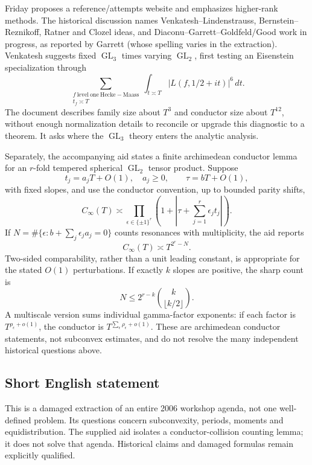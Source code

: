 \documentclass[11pt]{article}
\begin{document}
Friday proposes a reference/attempts website and emphasizes higher-rank methods. The historical discussion names Venkatesh--Lindenstrauss, Bernstein--Reznikoff, Ratner and Clozel ideas, and Diaconu--Garrett--Goldfeld/Good work in progress, as reported by Garrett (whose spelling varies in the extraction). Venkatesh suggests fixed $\operatorname{GL}_3$ times varying $\operatorname{GL}_2$, first testing an Eisenstein specialization through
\[
 \sum_{\substack{f\ \mathrm{level\ one\ Hecke\!\! -\!\! Maass}\\t_f\asymp T}}
 \int_{t\asymp T}|L(f,1/2+it)|^6\,dt.
\]
The document describes family size about $T^3$ and conductor size about $T^{12}$, without enough normalization details to reconcile or upgrade this diagnostic to a theorem. It asks where the $\operatorname{GL}_3$ theory enters the analytic analysis.

Separately, the accompanying aid states a finite archimedean conductor lemma for an $r$-fold tempered spherical $\operatorname{GL}_2$ tensor product. Suppose
\[
 t_j=a_jT+O(1),\quad a_j\geq0,\qquad \tau=bT+O(1),
\]
with fixed slopes, and use the conductor convention, up to bounded parity shifts,
\[
 C_\infty(T)\asymp\prod_{\epsilon\in\{\pm1\}^r}
       \left(1+\left|\tau+\sum_{j=1}^r\epsilon_jt_j\right|\right).
\]
If $N=\#\{\epsilon:b+\sum_j\epsilon_ja_j=0\}$ counts resonances with multiplicity, the aid reports
\[
 C_\infty(T)\asymp T^{2^r-N}.
\]
Two-sided comparability, rather than a unit leading constant, is appropriate for the stated $O(1)$ perturbations. If exactly $k$ slopes are positive, the sharp count is
\[
 N\leq2^{r-k}\binom{k}{\lfloor k/2\rfloor}.
\]
A multiscale version sums individual gamma-factor exponents: if each factor is $T^{\rho_\epsilon+o(1)}$, the conductor is $T^{\sum_\epsilon\rho_\epsilon+o(1)}$. These are archimedean conductor statements, not subconvex estimates, and do not resolve the many independent historical questions above.
\subsection{Short English statement}
This is a damaged extraction of an entire 2006 workshop agenda, not one well-defined problem. Its questions concern subconvexity, periods, moments and equidistribution. The supplied aid isolates a conductor-collision counting lemma; it does not solve that agenda. Historical claims and damaged formulas remain explicitly qualified.
\end{document}
